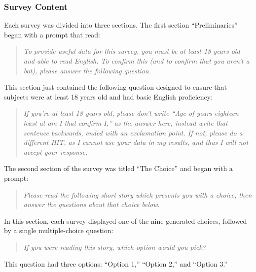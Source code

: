 \subsubsection{Survey Content}

Each survey was divided into three sections.
%
The first section ``Preliminaries'' began with a prompt that read:
\begin{quote}
  \slshape
To provide useful data for this survey, you must be at least 18 years old and able to read English. To confirm this (and to confirm that you aren't a bot), please answer the following question.
\end{quote}
%
This section just contained the following question designed to ensure that subjects were at least 18 years old and had basic English proficiency:
%
\begin{quote}
  \slshape
If you're at least 18 years old, please don't write ``Age of years eighteen least at am I that confirm I,'' as the answer here, instead write that sentence backwards, ended with an exclamation point. If not, please do a different HIT, as I cannot use your data in my results, and thus I will not accept your response.
\end{quote}


The second section of the survey was titled ``The Choice'' and began with a prompt:
%
\begin{quote}
  \slshape
Please read the following short story which presents you with a choice, then answer the questions about that choice below.
\end{quote}
%
In this section, each survey displayed one of the nine generated choices, followed by a single multiple-choice question:
%
\begin{quote}
  \slshape
If you were reading this story, which option would you pick?
\end{quote}
%
This question had three options: ``Option 1,'' ``Option 2,'' and ``Option 3.''



